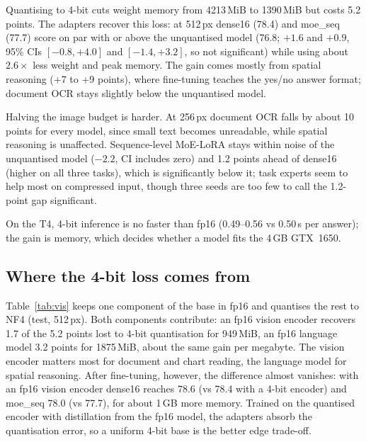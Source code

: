 \documentclass[conference]{IEEEtran}
\begin{document}
Quantising to 4-bit cuts weight memory from 4213\,MiB to 1390\,MiB but costs 5.2 points. The adapters
recover this loss: at 512\,px dense16 (78.4) and moe\_seq (77.7) score on par with or above the
unquantised model (76.8; $+1.6$ and $+0.9$, 95\% CIs $[-0.8,+4.0]$ and $[-1.4,+3.2]$, so not
significant) while using about $2.6\times$ less weight and peak memory. The gain comes
mostly from spatial reasoning (+7 to +9 points), where fine-tuning teaches the yes/no answer format;
document OCR stays slightly below the unquantised model.

Halving the image budget is harder. At 256\,px document OCR falls by about 10 points for every model,
since small text becomes unreadable, while spatial reasoning is unaffected. Sequence-level MoE-LoRA
stays within noise of the unquantised model ($-2.2$, CI includes zero) and 1.2 points ahead of dense16
(higher on all three tasks), which is significantly below it; task experts seem to help most on compressed
input, though three seeds are too few to call the 1.2-point gap significant.

On the T4, 4-bit inference is no faster than fp16 (0.49--0.56 vs 0.50\,s per answer); the gain is
memory, which decides whether a model fits the 4\,GB GTX~1650.

\subsection{Where the 4-bit loss comes from}
Table~\ref{tab:vis} keeps one component of the base in fp16 and quantises the rest to NF4 (test, 512\,px).
Both components contribute: an fp16 vision encoder recovers 1.7 of the 5.2 points lost to 4-bit
quantisation for 949\,MiB, an fp16 language model 3.2 points for 1875\,MiB, about the same gain per
megabyte. The vision encoder matters most for document and chart reading, the language model for
spatial reasoning. After fine-tuning, however, the difference almost vanishes: with an fp16 vision
encoder dense16 reaches 78.6 (vs 78.4 with a 4-bit encoder) and moe\_seq 78.0 (vs 77.7), for
about 1\,GB more memory. Trained on the quantised encoder with distillation from the fp16 model,
the adapters absorb the quantisation error, so a uniform 4-bit base is the better edge trade-off.
\end{document}
